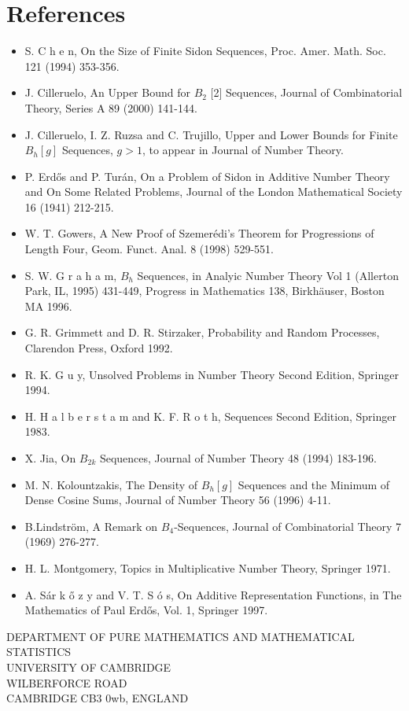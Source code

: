 \documentclass[10pt]{article}
\begin{document}
\section*{References}
\begin{itemize}
  \item[] [1] S. C h e n, On the Size of Finite Sidon Sequences, Proc. Amer. Math. Soc. 121 (1994) 353-356.
  \item[] [2] J. Cilleruelo, An Upper Bound for $B_{2}$ [2] Sequences, Journal of Combinatorial Theory, Series A 89 (2000) 141-144.
  \item[] [3] J. Cilleruelo, I. Z. Ruzsa and C. Trujillo, Upper and Lower Bounds for Finite $B_{h}[g]$ Sequences, $g>1$, to appear in Journal of Number Theory.
  \item[] [4] P. Erdős and P. Turán, On a Problem of Sidon in Additive Number Theory and On Some Related Problems, Journal of the London Mathematical Society 16 (1941) 212-215.
  \item[] [5] W. T. Gowers, A New Proof of Szemerédi's Theorem for Progressions of Length Four, Geom. Funct. Anal. 8 (1998) 529-551.
\end{itemize}

\begin{itemize}
  \item[] [6] S. W. G r a h a m, $B_{h}$ Sequences, in Analyic Number Theory Vol 1 (Allerton Park, IL, 1995) 431-449, Progress in Mathematics 138, Birkhäuser, Boston MA 1996.
  \item[] [7] G. R. Grimmett and D. R. Stirzaker, Probability and Random Processes, Clarendon Press, Oxford 1992.
  \item[] [8] R. K. G u y, Unsolved Problems in Number Theory Second Edition, Springer 1994.
  \item[] [9] H. H a l b e r s t a m and K. F. R o t h, Sequences Second Edition, Springer 1983.
  \item[] [10] X. Jia, On $B_{2 k}$ Sequences, Journal of Number Theory 48 (1994) 183-196.
  \item[] [11] M. N. Kolountzakis, The Density of $B_{h}[g]$ Sequences and the Minimum of Dense Cosine Sums, Journal of Number Theory 56 (1996) 4-11.
  \item[] [12] B.Lindström, A Remark on $B_{4}$-Sequences, Journal of Combinatorial Theory 7 (1969) 276-277.
  \item[] [13] H. L. Montgomery, Topics in Multiplicative Number Theory, Springer 1971.
  \item[] [14] A. Sár k ő z y and V. T. S ó s, On Additive Representation Functions, in The Mathematics of Paul Erdős, Vol. 1, Springer 1997.
\end{itemize}

DEPARTMENT OF PURE MATHEMATICS AND MATHEMATICAL STATISTICS\\
UNIVERSITY OF CAMBRIDGE\\
WILBERFORCE ROAD\\
CAMBRIDGE CB3 0wb, ENGLAND
\end{document}
